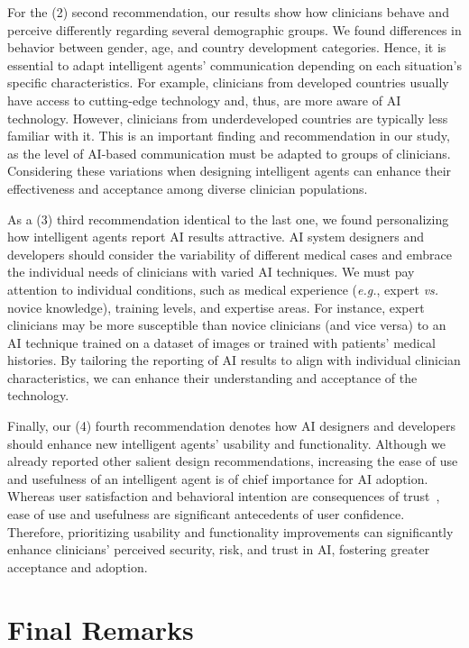 For the (2) second recommendation, our results show how clinicians behave and perceive differently regarding several demographic groups.
We found differences in behavior between gender, age, and country development categories.
Hence, it is essential to adapt intelligent agents' communication depending on each situation's specific characteristics.
For example, clinicians from developed countries usually have access to cutting-edge technology and, thus, are more aware of \ac{AI} technology. However, clinicians from underdeveloped countries are typically less familiar with it.
This is an important finding and recommendation in our study, as the level of \ac{AI}-based communication must be adapted to groups of clinicians.
Considering these variations when designing intelligent agents can enhance their effectiveness and acceptance among diverse clinician populations.

As a (3) third recommendation identical to the last one, we found personalizing how intelligent agents report \ac{AI} results attractive.
\ac{AI} system designers and developers should consider the variability of different medical cases and embrace the individual needs of clinicians with varied \ac{AI} techniques.
We must pay attention to individual conditions, such as medical experience ({\it e.g.}, expert {\it vs.} novice knowledge), training levels, and expertise areas.
For instance, expert clinicians may be more susceptible than novice clinicians (and vice versa) to an \ac{AI} technique trained on a dataset of images or trained with patients' medical histories.
By tailoring the reporting of \ac{AI} results to align with individual clinician characteristics, we can enhance their understanding and acceptance of the technology.

Finally, our (4) fourth recommendation denotes how \ac{AI} designers and developers should enhance new intelligent agents' usability and functionality.
Although we already reported other salient design recommendations, increasing the ease of use and usefulness of an intelligent agent is of chief importance for \ac{AI} adoption.
Whereas user satisfaction and behavioral intention are consequences of trust~\cite{LIU2022107026, LV2022106993}, ease of use and usefulness are significant antecedents of user confidence.
Therefore, prioritizing usability and functionality improvements can significantly enhance clinicians' perceived security, risk, and trust in \ac{AI}, fostering greater acceptance and adoption.

\section{Final Remarks}
\label{chap:app002006}

